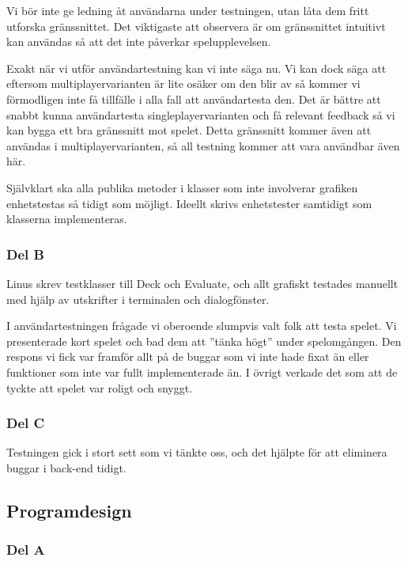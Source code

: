 \documentclass[10pt,a4paper]{article}
\begin{document}
Vi bör inte ge ledning åt användarna under testningen, utan låta dem fritt
utforska gränssnittet. Det viktigaste att observera är om gränssnittet
intuitivt kan användas så att det inte påverkar spelupplevelsen.

Exakt när vi utför användartestning kan vi inte säga nu. Vi kan dock säga
att eftersom multiplayervarianten är lite osäker om den blir av så kommer
vi förmodligen inte få tillfälle i alla fall att användartesta den. Det är
bättre att snabbt kunna användartesta singleplayervarianten och få relevant
feedback så vi kan bygga ett bra gränssnitt mot spelet. Detta gränssnitt
kommer även att användas i multiplayervarianten, så all testning kommer att
vara användbar även här.

Självklart ska alla publika metoder i klasser som inte involverar grafiken
enhetstestas så tidigt som möjligt. Ideellt skrivs enhetstester samtidigt
som klasserna implementeras.

\subsubsection*{Del B}

Linus skrev testklasser till Deck och Evaluate, och allt grafiskt testades
manuellt med hjälp av utskrifter i terminalen och dialogfönster.

I användartestningen frågade vi oberoende slumpvis valt folk att testa
spelet. Vi presenterade kort spelet och bad dem att ''tänka högt'' under
spelomgången. Den respons vi fick var framför allt på de buggar som vi inte
hade fixat än eller funktioner som inte var fullt implementerade än. I
övrigt verkade det som att de tyckte att spelet var roligt och snyggt.

\subsubsection*{Del C}

Testningen gick i stort sett som vi tänkte oss, och det hjälpte för att
eliminera buggar i back-end tidigt.

\subsection*{Programdesign}

\subsubsection*{Del A}
\end{document}

